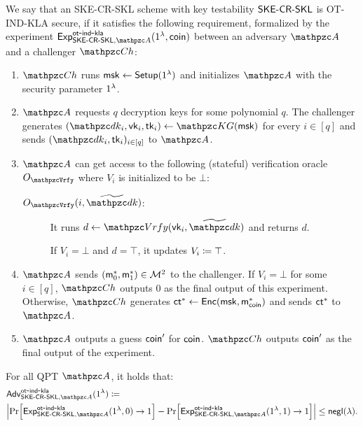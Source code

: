 \begin{definition}\label{def:OT-IND-CPA_SKECRSKL}
We say that an SKE-CR-SKL scheme with key testability $\mathsf{SKE}\textrm{-}\mathsf{CR}\textrm{-}\mathsf{SKL}$
is OT-IND-KLA secure, if it satisfies
the following requirement, formalized by the experiment
$\expc{\SKECRSKL,\qA}{ot}{ind}{kla}(1^\secp,\coin)$ between an
adversary $\qA$ and a challenger $\qCh$:

\begin{enumerate}
\item $\qCh$ runs $\mathsf{msk}\leftarrow\mathsf{Setup}(1^\lambda)$ and initializes
$\qA$ with the security parameter $1^\lambda$.

\item $\qA$ requests $q$ decryption keys for some polynomial $q$.
The challenger generates $(\qdk_i,\vk_i,\tk_i)\gets\qKG(\msk)$
for every $i\in[q]$ and sends $(\qdk_i,\tk_i)_{i\in[q]}$ to $\qA$.

\item $\qA$ can get access to the following (stateful) verification
oracle $\Oracle{\qVrfy}$ where $V_i$ is initialized to be $\bot$:

\begin{description}
\item[ $\Oracle{\qVrfy}(i, \widetilde{\qdk})$:] It runs $d \gets
\qVrfy(\vk_i, \widetilde{\qdk})$ and returns $d$.  

If $V_i=\bot$ and $d=\top$, it updates $V_i\coloneqq \top$. 
\end{description}
\item $\qA$ sends $(\mathsf{m}_0^*,\mathsf{m}_1^*)\in \mathcal{M}^2$ to the challenger.
If $V_i=\bot$ for some $i\in[q]$, $\qCh$ outputs
$0$ as the final output of this experiment. Otherwise, $\qCh$
generates $\mathsf{ct}^*\leftarrow\mathsf{Enc}(\mathsf{msk},\mathsf{m}_{\mathsf{coin}}^*)$ and sends
$\mathsf{ct}^*$ to $\qA$.

\item $\qA$ outputs a guess $\mathsf{coin}^\prime$ for $\mathsf{coin}$.
$\qCh$ outputs $\mathsf{coin}'$ as the final output of the
experiment.
\end{enumerate}

For all QPT $\qA$, it holds that:
\begin{align}
&\advc{\SKECRSKL,\qA}{ot}{ind}{kla}(1^\secp) \seteq\\
&\abs{\Pr[\expc{\SKECRSKL,\qA}{ot}{ind}{kla} (1^\secp,0) \ra 1] - \Pr[\expc{\SKECRSKL,\qA}{ot}{ind}{kla} (1^\secp,1) \ra 1] }\leq \negl(\secp).
\end{align} 
\end{definition}

